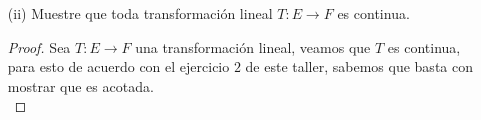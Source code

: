 \begin{enumerate}
\begin{proof}









        
   \end{proof}
  
   \item[(ii)] Muestre que toda transformación lineal $T : E \to F$ es continua.
    \begin{proof}
    Sea $T: E\rightarrow F$ una transformación lineal, veamos que $T$ es continua, para esto de acuerdo con el ejercicio $2$ de este taller, sabemos que basta con mostrar que es acotada.\\


\end{proof}
\end{enumerate}
